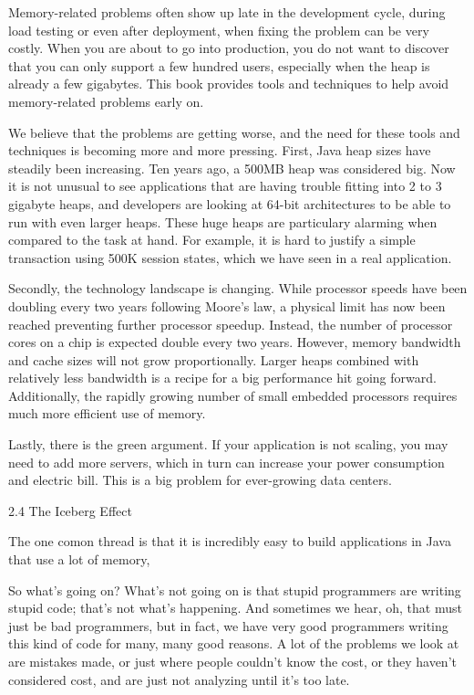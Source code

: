 Memory-related problems often show up late in the development cycle, during load testing or even after deployment, when fixing the problem can be very costly. When you are about to go into production, you do not want to discover that you can only support a few hundred users, especially when the heap is already a few gigabytes. This book provides tools and techniques to help avoid memory-related problems early on. 

We believe that the problems are getting worse, and the need for these tools and techniques is becoming more and more pressing. First, Java heap sizes have steadily been increasing.  Ten years ago, a 500MB heap was considered big. Now it is not unusual to see applications that are having trouble fitting into 2 to 3 gigabyte heaps, and developers are looking at 64-bit architectures to be able to run with even larger heaps.  These huge heaps are particulary alarming when compared to the task at hand. For example, it is hard to justify a simple transaction using 500K session states, which we have seen in a real application.       

Secondly, the technology landscape is changing. While processor speeds have been doubling every two years following Moore's law, a physical limit has now been reached preventing further processor speedup. Instead, the number of processor cores on a chip is expected double every two years. However, memory bandwidth and cache sizes will not grow proportionally. Larger heaps combined with relatively less bandwidth is a recipe for a big performance hit going forward. Additionally, the rapidly growing number of small embedded processors requires much more efficient use of memory.

Lastly, there is the green argument. If your application is not scaling, you may need to add more servers, which in turn can increase your power consumption and electric bill. This is a big problem for ever-growing data centers.


2.4 The Iceberg Effect

The one comon thread is that it is incredibly easy to build applications in Java that use a lot of memory, 

So what's going on? What's not going on is that stupid programmers are writing stupid code; that's not what's happening.  And sometimes we hear, oh, that must just be bad programmers, but in fact, we have very good programmers writing this kind of code for many, many good reasons. A lot of the problems we look at are mistakes made, or just where people couldn't know the cost, or they haven't considered cost, and are just not analyzing until it's too late. 

